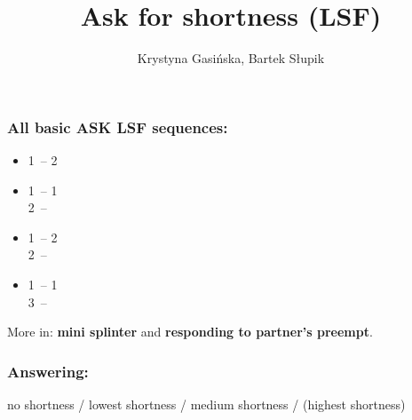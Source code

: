 \documentclass[12pt, a4paper]{article}
\title{Ask for shortness (LSF)}
\author{Krystyna Gasińska, Bartek Słupik}
\begin{document}
\maketitle


\subsubsection*{All basic ASK LSF sequences:}
\begin{itemize}
    \item 1\major\ -- 2\major\ \\ 
    \item 1\minor\ -- 1\major\ \\ 2\major\ -- 
    \item 1\major\ -- 2 \\ 2\major\ -- 
    \item 1\minor\ -- 1\major \\ 3\major\ -- 
\end{itemize}

More in: \textbf{mini splinter} and \textbf{responding to partner's preempt}.

\subsubsection*{Answering:}

no shortness / lowest shortness / medium shortness / (highest shortness)

\end{document}
